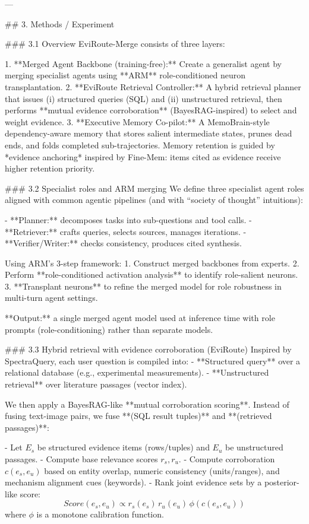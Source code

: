 ---

## 3. Methods / Experiment  

### 3.1 Overview  
EviRoute-Merge consists of three layers:

1. **Merged Agent Backbone (training-free):** Create a generalist agent by merging specialist agents using **ARM** role-conditioned neuron transplantation.  
2. **EviRoute Retrieval Controller:** A hybrid retrieval planner that issues (i) structured queries (SQL) and (ii) unstructured retrieval, then performs **mutual evidence corroboration** (BayesRAG-inspired) to select and weight evidence.  
3. **Executive Memory Co-pilot:** A MemoBrain-style dependency-aware memory that stores salient intermediate states, prunes dead ends, and folds completed sub-trajectories. Memory retention is guided by *evidence anchoring* inspired by Fine-Mem: items cited as evidence receive higher retention priority.

### 3.2 Specialist roles and ARM merging  
We define three specialist agent roles aligned with common agentic pipelines (and with “society of thought” intuitions):

- **Planner:** decomposes tasks into sub-questions and tool calls.  
- **Retriever:** crafts queries, selects sources, manages iterations.  
- **Verifier/Writer:** checks consistency, produces cited synthesis.

Using ARM’s 3-step framework:
1. Construct merged backbones from experts.  
2. Perform **role-conditioned activation analysis** to identify role-salient neurons.  
3. **Transplant neurons** to refine the merged model for role robustness in multi-turn agent settings.

**Output:** a single merged agent model used at inference time with role prompts (role-conditioning) rather than separate models.

### 3.3 Hybrid retrieval with evidence corroboration (EviRoute)  
Inspired by SpectraQuery, each user question is compiled into:
- **Structured query** over a relational database (e.g., experimental measurements).  
- **Unstructured retrieval** over literature passages (vector index).

We then apply a BayesRAG-like **mutual corroboration scoring**. Instead of fusing text-image pairs, we fuse **(SQL result tuples)** and **(retrieved passages)**:

- Let \(E_s\) be structured evidence items (rows/tuples) and \(E_u\) be unstructured passages.  
- Compute base relevance scores \(r_s, r_u\).  
- Compute corroboration \(c(e_s, e_u)\) based on entity overlap, numeric consistency (units/ranges), and mechanism alignment cues (keywords).  
- Rank joint evidence sets by a posterior-like score:
\[
Score(e_s, e_u) \propto r_s(e_s)\, r_u(e_u)\, \phi(c(e_s,e_u))
\]
where \(\phi\) is a monotone calibration function.

